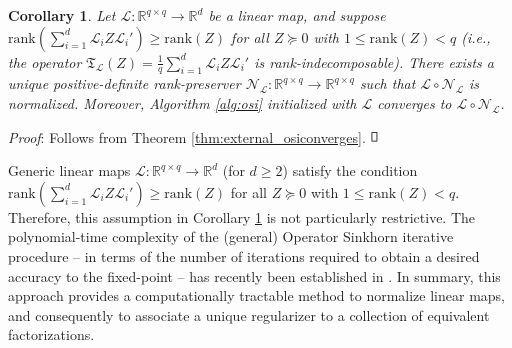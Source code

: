 \documentclass[11pt,letterpaper]{article}
\newtheorem{corollary}[theorem]{Corollary}
\def\endproof{\vbox{\hrule height0.6pt\hbox{%
   \vrule height1.3ex width0.6pt\hskip0.8ex
   \vrule width0.6pt}\hrule height0.6pt
  }}
\newcommand{\R}{\mathbb{R}}
\renewcommand{\L}{\mathcal{L}}
\newcommand{\T}{\mathfrak{T}}
\begin{document}
\begin{corollary} \label{thm:external_normalizablelinearmaps}
Let $\L : \R^{q \times q} \rightarrow \R^d$ be a linear map, and suppose $\mathrm{rank}\left(\sum_{i=1}^d \L_{i} Z {\L_{i}}' \right) \geq \mathrm{rank}(Z)$ for all $Z \succeq 0$ with $1 \leq \mathrm{rank}(Z) < q$ (i.e., the operator $\T_\L(Z) = \frac{1}{q} \sum_{i=1}^d \L_{i} Z {\L_{i}}'$ is rank-indecomposable).  There exists a \emph{unique} positive-definite rank-preserver $\mathcal{N}_\L : \R^{q \times q} \rightarrow \R^{q \times q}$ such that $\L \circ \mathcal{N}_\L$ is normalized.  Moreover, Algorithm \ref{alg:osi} initialized with $\L$ converges to $\L \circ \mathcal{N}_\L$.
\end{corollary}

\noindent \emph{Proof}: Follows from Theorem \ref{thm:external_osiconverges}. $\endproof$

Generic linear maps $\L : \R^{q \times q} \rightarrow \R^d$ (for $d \geq 2$) satisfy the condition $\mathrm{rank}\left(\sum_{i=1}^d \L_{i} Z {\L_{i}}' \right) \geq \mathrm{rank}(Z)$ for all $Z \succeq 0$ with $1 \leq \mathrm{rank}(Z) < q$.  Therefore, this assumption in Corollary \ref{thm:external_normalizablelinearmaps} is not particularly restrictive.  The polynomial-time complexity of the (general) Operator Sinkhorn iterative procedure -- in terms of the number of iterations required to obtain a desired accuracy to the fixed-point -- has recently been established in \cite{GGOW:15}.  In summary, this approach provides a computationally tractable method to normalize linear maps, and consequently to associate a unique regularizer to a collection of equivalent factorizations.
\end{document}
